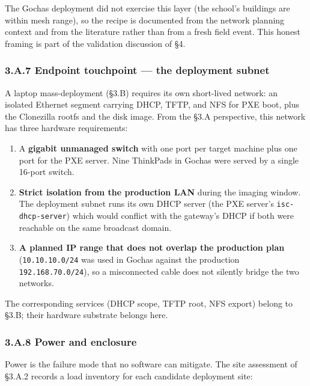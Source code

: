 The Gochas deployment did not exercise this layer (the school's
buildings are within mesh range), so the recipe is documented from the
network planning context and from the literature rather than from a
fresh field event. This honest framing is part of the validation
discussion of §4.

\hypertarget{a.7-endpoint-touchpoint-the-deployment-subnet}{%
\subsubsection{3.A.7 Endpoint touchpoint --- the deployment
subnet}\label{a.7-endpoint-touchpoint-the-deployment-subnet}}

A laptop mass-deployment (§3.B) requires its own short-lived network: an
isolated Ethernet segment carrying DHCP, TFTP, and NFS for PXE boot,
plus the Clonezilla rootfs and the disk image. From the §3.A
perspective, this network has three hardware requirements:

\begin{enumerate}
\def\labelenumi{\arabic{enumi}.}
\tightlist
\item
  A \textbf{gigabit unmanaged switch} with one port per target machine
  plus one port for the PXE server. Nine ThinkPads in Gochas were served
  by a single 16-port switch.
\item
  \textbf{Strict isolation from the production LAN} during the imaging
  window. The deployment subnet runs its own DHCP server (the PXE
  server's \texttt{isc-dhcp-server}) which would conflict with the
  gateway's DHCP if both were reachable on the same broadcast domain.
\item
  \textbf{A planned IP range that does not overlap the production plan}
  (\texttt{10.10.10.0/24} was used in Gochas against the production
  \texttt{192.168.70.0/24}), so a misconnected cable does not silently
  bridge the two networks.
\end{enumerate}

The corresponding services (DHCP scope, TFTP root, NFS export) belong to
§3.B; their hardware substrate belongs here.

\hypertarget{a.8-power-and-enclosure}{%
\subsubsection{3.A.8 Power and
enclosure}\label{a.8-power-and-enclosure}}

Power is the failure mode that no software can mitigate. The site
assessment of §3.A.2 records a load inventory for each candidate
deployment site:


